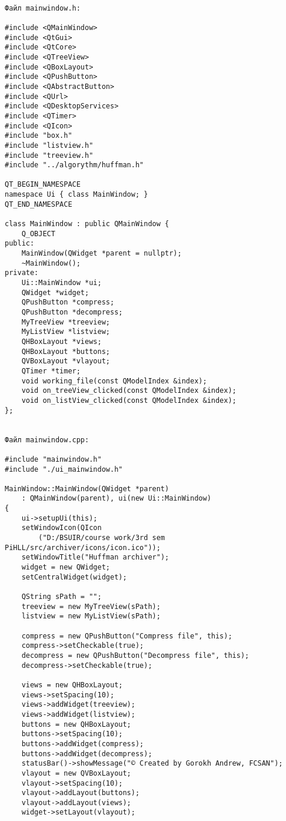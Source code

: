 \begin{verbatim}

Файл mainwindow.h:

#include <QMainWindow>
#include <QtGui>
#include <QtCore>
#include <QTreeView>
#include <QBoxLayout>
#include <QPushButton>
#include <QAbstractButton>
#include <QUrl>
#include <QDesktopServices>
#include <QTimer>
#include <QIcon>
#include "box.h"
#include "listview.h"
#include "treeview.h"
#include "../algorythm/huffman.h"

QT_BEGIN_NAMESPACE
namespace Ui { class MainWindow; }
QT_END_NAMESPACE

class MainWindow : public QMainWindow {
    Q_OBJECT
public:
    MainWindow(QWidget *parent = nullptr);
    ~MainWindow();
private:
    Ui::MainWindow *ui;
    QWidget *widget;
    QPushButton *compress;
    QPushButton *decompress;
    MyTreeView *treeview;
    MyListView *listview;
    QHBoxLayout *views;
    QHBoxLayout *buttons;
    QVBoxLayout *vlayout;
    QTimer *timer;
    void working_file(const QModelIndex &index);
    void on_treeView_clicked(const QModelIndex &index);
    void on_listView_clicked(const QModelIndex &index);
};


Файл mainwindow.cpp:

#include "mainwindow.h"
#include "./ui_mainwindow.h"

MainWindow::MainWindow(QWidget *parent)
    : QMainWindow(parent), ui(new Ui::MainWindow)
{
    ui->setupUi(this);
    setWindowIcon(QIcon
        ("D:/BSUIR/course work/3rd sem PiHLL/src/archiver/icons/icon.ico"));
    setWindowTitle("Huffman archiver");
    widget = new QWidget;
    setCentralWidget(widget);

    QString sPath = "";
    treeview = new MyTreeView(sPath);
    listview = new MyListView(sPath);

    compress = new QPushButton("Compress file", this);
    compress->setCheckable(true);
    decompress = new QPushButton("Decompress file", this);
    decompress->setCheckable(true);

    views = new QHBoxLayout;
    views->setSpacing(10);
    views->addWidget(treeview);
    views->addWidget(listview);
    buttons = new QHBoxLayout;
    buttons->setSpacing(10);
    buttons->addWidget(compress);
    buttons->addWidget(decompress);
    statusBar()->showMessage("© Created by Gorokh Andrew, FCSAN");
    vlayout = new QVBoxLayout;
    vlayout->setSpacing(10);
    vlayout->addLayout(buttons);
    vlayout->addLayout(views);
    widget->setLayout(vlayout);
    

\end{verbatim}
